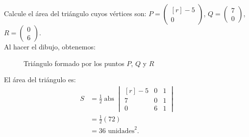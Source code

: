 \begin{example}
    Calcule el área del triángulo cuyos vértices son: $P = \begin{pmatrix*}[r]
        -5 \\
        0
    \end{pmatrix*}$, $Q = \begin{pmatrix}
        7 \\
        0
    \end{pmatrix}$, $R = \begin{pmatrix}
        0 \\
        6
    \end{pmatrix}$. \\
    \solucion Al hacer el dibujo, obtenemos:
    \begin{figure}[h!]
        \centering
        \caption{Triángulo formado por los puntos $P$, $Q$ y $R$}
    \end{figure}
    
    \noindent
    El área del triángulo es:
    \begin{align*}
        S & = \frac{1}{2} \operatorname{abs} \begin{vmatrix*}[r]
            -5 & 0 & 1 \\
            7 & 0 & 1 \\
            0 & 6 & 1
        \end{vmatrix*} \\
        & = \frac{1}{2} (72) \\
        & = 36 \text{ unidades}^2.
    \end{align*}
\end{example}

